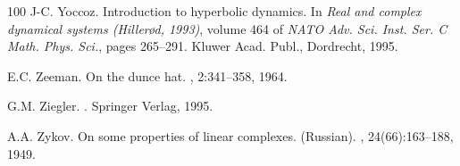 \documentclass[12pt]{amsart}
\begin{document}
\begin{thebibliography}{100}
J-C. Yoccoz.
\newblock Introduction to hyperbolic dynamics.
\newblock In {\em Real and complex dynamical systems ({Hiller\o d}, 1993)},
  volume 464 of {\em NATO Adv. Sci. Inst. Ser. C Math. Phys. Sci.}, pages
  265--291. Kluwer Acad. Publ., Dordrecht, 1995.

E.C. Zeeman.
\newblock On the dunce hat.
, 2:341--358, 1964.

G.M. Ziegler.
.
\newblock Springer Verlag, 1995.

A.A. Zykov.
\newblock On some properties of linear complexes. ({R}ussian).
, 24(66):163--188, 1949.

\end{thebibliography}
\end{document}
